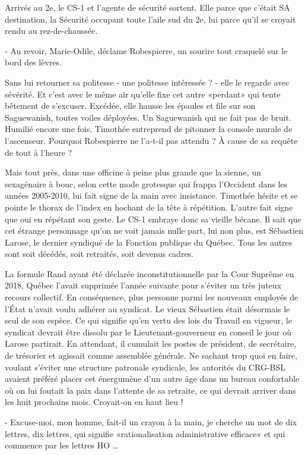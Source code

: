 Arrivés au 2e, le CS-1 et l’agente de sécurité sortent. Elle parce que c’était SA destination, la Sécurité occupant toute l’aile sud du 2e, lui parce qu’il se croyait rendu au rez-de-chaussée.

- Au revoir, Marie-Odile, déclame Robespierre, un sourire tout craquelé sur le bord des lèvres.

Sans lui retourner sa politesse - une politesse intéressée ? - elle le regarde avec sévérité. Et c’est avec le même air qu’elle fixe cet autre «perdant» qui tente bêtement de s’excuser. Excédée, elle hausse les épaules et file sur son Saguewanish, toutes voiles déployées. Un Saguewanish qui ne fait pas de bruit. Humilié encore une fois, Timothée entreprend de pitonner la console murale de l’ascenseur. Pourquoi Robespierre ne l’a-t-il pas attendu ? À cause de sa requête de tout à l’heure ?

Mais tout près, dans une officine à peine plus grande que la sienne, un sexagénaire à bouc, selon cette mode grotesque qui frappa l’Occident dans les années 2005-2010, lui fait signe de la main avec insistance. Timothée hésite et se pointe le thorax de l’index en hochant de la tête à répétition. L’autre fait signe que oui en répétant son geste. Le CS-1 embraye donc sa vieille bécane. Il sait que cet étrange personnage qu’on ne voit jamais nulle part, lui non plus, est Sébastien Larose, le dernier syndiqué de la Fonction publique du Québec. Tous les autres sont soit décédés, soit retraités, soit devenus cadres.

La formule Rand ayant été déclarée inconstitutionnelle par la Cour Suprême en 2018, Québec l’avait supprimée l’année suivante pour s’éviter un très juteux recours collectif. En conséquence, plus personne parmi les nouveaux employés de l’État n’avait voulu adhérer au syndicat. Le vieux Sébastien était désormais le seul de son espèce. Ce qui signifie qu’en vertu des lois du Travail en vigueur, le syndicat devrait être dissolu par le Lieutenant-gouverneur en conseil le jour où Larose partirait. En attendant, il cumulait les postes de président, de secrétaire, de trésorier et agissait comme assemblée générale. Ne sachant trop quoi en faire, voulant s’éviter une structure patronale syndicale, les autorités du CRG-BSL avaient préféré placer cet énergumène d’un autre âge dans un bureau confortable où on lui foutait la paix dans l’attente de sa retraite, ce qui devrait arriver dans les huit prochains mois. Croyait-on en haut lieu !

- Excuse-moi, mon homme, fait-il un crayon à la main, je cherche un mot de dix lettres, dix lettres, qui signifie «rationalisation administrative efficace» et qui commence par les lettres HO …

